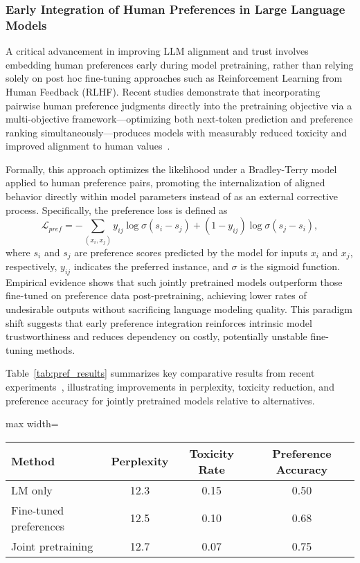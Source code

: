 \documentclass[sigconf]{acmart}
\begin{document}
\subsubsection{Early Integration of Human Preferences in Large Language Models}

A critical advancement in improving LLM alignment and trust involves embedding human preferences early during model pretraining, rather than relying solely on post hoc fine-tuning approaches such as Reinforcement Learning from Human Feedback (RLHF). Recent studies demonstrate that incorporating pairwise human preference judgments directly into the pretraining objective via a multi-objective framework—optimizing both next-token prediction and preference ranking simultaneously—produces models with measurably reduced toxicity and improved alignment to human values~\cite{ref41}.

Formally, this approach optimizes the likelihood under a Bradley-Terry model applied to human preference pairs, promoting the internalization of aligned behavior directly within model parameters instead of as an external corrective process. Specifically, the preference loss is defined as
\[
\mathcal{L}_{pref} = - \sum_{(x_i, x_j)} y_{ij} \log \sigma(s_i - s_j) + (1 - y_{ij}) \log \sigma(s_j - s_i),
\]
where $s_i$ and $s_j$ are preference scores predicted by the model for inputs $x_i$ and $x_j$, respectively, $y_{ij}$ indicates the preferred instance, and $\sigma$ is the sigmoid function. Empirical evidence shows that such jointly pretrained models outperform those fine-tuned on preference data post-pretraining, achieving lower rates of undesirable outputs without sacrificing language modeling quality. This paradigm shift suggests that early preference integration reinforces intrinsic model trustworthiness and reduces dependency on costly, potentially unstable fine-tuning methods.

Table~\ref{tab:pref_results} summarizes key comparative results from recent experiments~\cite{ref41}, illustrating improvements in perplexity, toxicity reduction, and preference accuracy for jointly pretrained models relative to alternatives.

\begin{table*}[htbp]
\centering
\caption{Performance comparison of language models trained with and without early integration of human preferences~\cite{ref41}.}
\label{tab:pref_results}
\begin{adjustbox}{max width=\textwidth}
\begin{tabular}{@{}lccc@{}}
\toprule
Method & Perplexity & Toxicity Rate & Preference Accuracy \\
\midrule
LM only & 12.3 & 0.15 & 0.50 \\
Fine-tuned preferences & 12.5 & 0.10 & 0.68 \\
Joint pretraining & 12.7 & 0.07 & 0.75 \\
\bottomrule
\end{tabular}
\end{adjustbox}
\end{table*}
\end{document}
